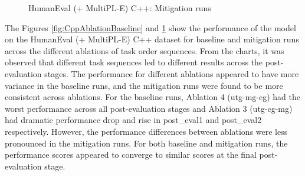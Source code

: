 \begin{figure}[H]
\begin{minipage}{0.45\textwidth}
        \captionsetup{width=1.1\textwidth}
        \caption{HumanEval (+ MultiPL-E) C++: Mitigation runs}
        \label{fig:CppAblationMitigation}
    \end{minipage}
\end{figure}
The Figures \ref{fig:CppAblationBaseline} and \ref{fig:CppAblationMitigation} show the performance of the model on the HumanEval (+ MultiPL-E) C++ dataset for baseline and mitigation runs across the different ablations of task order sequences. From the charts, it was observed that different task sequences led to different results across the post-evaluation stages. The performance for different ablations appeared to have more variance in the baseline runs, and the mitigation runs were found to be more consistent across ablations. For the baseline runs, Ablation 4 (utg-mg-cg) had  the worst performance across all post-evaluation stages and Ablation 3 (utg-cg-mg) had dramatic performance drop and rise in post\_eval1 and post\_eval2 respectively. However, the performance differences between ablations were less pronounced in the mitigation runs. For both baseline and mitigation runs, the performance scores appeared to converge to similar scores at the final post-evaluation stage.

